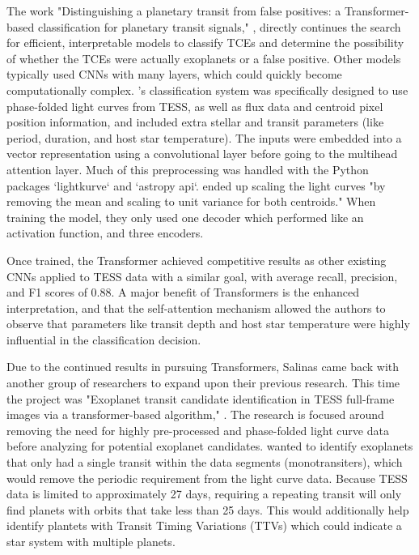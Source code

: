 \documentclass[letterpaper]{article} %
\begin{document}
The work "Distinguishing a planetary transit from false positives: a Transformer-based classification for planetary transit signals," \cite{salinas2023distinguishingtransitfalsepositives}, directly continues the search for efficient, interpretable models to classify TCEs and determine the possibility of whether the TCEs were actually exoplanets or a false positive. Other models typically used CNNs with many layers, which could quickly become computationally complex. \citeauthor{salinas2023distinguishingtransitfalsepositives}'s classification system was specifically designed to use phase-folded light curves from TESS, as well as flux data and centroid pixel position information, and included extra stellar and transit parameters (like period, duration, and host star temperature). The inputs were embedded into a vector representation using a convolutional layer before going to the multihead attention layer. Much of this preprocessing was handled with the Python packages `lightkurve` and `astropy api`. \citeauthor{salinas2023distinguishingtransitfalsepositives} ended up scaling the light curves "by removing the mean and scaling to unit variance for both centroids." When training the model, they only used one decoder which performed like an activation function, and three encoders. 

Once trained, the Transformer achieved competitive results as other existing CNNs applied to TESS data with a similar goal, with average recall, precision, and F1 scores of 0.88. A major benefit of Transformers is the enhanced interpretation, and that the self-attention mechanism allowed the authors to observe that parameters like transit depth and host star temperature were highly influential in the classification decision. 

Due to the continued results in pursuing Transformers, Salinas came back with another group of researchers to expand upon their previous research. This time the project was "Exoplanet transit candidate identification in TESS full-frame images via a transformer-based algorithm," \cite{salinas2025tessfullframe}. The research is focused around removing the need for highly pre-processed and phase-folded light curve data before analyzing for potential exoplanet candidates. \citeauthor{salinas2025tessfullframe} wanted to identify exoplanets that only had a single transit within the data segments (monotransiters), which would remove the periodic requirement from the light curve data. Because TESS data is limited to approximately 27 days, requiring a repeating transit will only find planets with orbits that take less than 25 days. This would additionally help identify plantets with Transit Timing Variations (TTVs) which could indicate a star system with multiple planets. 
\end{document}
